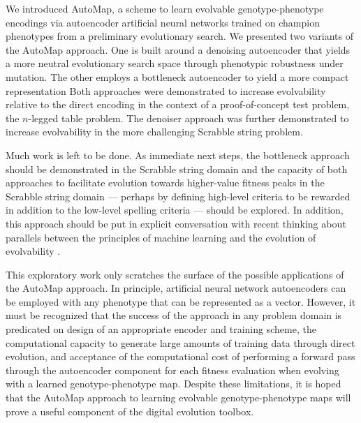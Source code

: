 We introduced AutoMap, a scheme to learn evolvable genotype-phenotype encodings via autoencoder artificial neural networks trained on champion phenotypes from a preliminary evolutionary search.
We presented two variants of the AutoMap approach.
One is built around a denoising autoencoder that yields a more neutral evolutionary search space through phenotypic robustness under mutation.
The other employs a bottleneck autoencoder to yield a more compact representation
Both approaches were demonstrated to increase evolvability relative to the direct encoding in the context of a proof-of-concept test problem, the $n$-legged table problem.
The denoiser approach was further demonstrated to increase evolvability in the more challenging Scrabble string problem.

Much work is left to be done.
As immediate next steps, the bottleneck approach should be demonstrated in the Scrabble string domain and the capacity of both approaches to facilitate evolution towards higher-value fitness peaks in the Scrabble string domain --- perhaps by defining high-level criteria to be rewarded in addition to the low-level spelling criteria --- should be explored.
In addition, this approach should be put in explicit conversation with recent thinking about parallels between the principles of machine learning and the evolution of evolvability \cite{kouvaris2017evolution, watson2016can}.

This exploratory work only scratches the surface of the possible applications of the AutoMap approach.
In principle, artificial neural network autoencoders can be employed with any phenotype that can be represented as a vector.
However, it must be recognized that the success of the approach in any problem domain is predicated on design of an appropriate encoder and training scheme, the computational capacity to generate large amounts of training data through direct evolution, and acceptance of the computational cost of performing a forward pass through the autoencoder component for each fitness evaluation when evolving with a learned genotype-phenotype map.
Despite these limitations, it is hoped that the AutoMap approach to learning evolvable genotype-phenotype maps will prove a useful component of the digital evolution toolbox.
